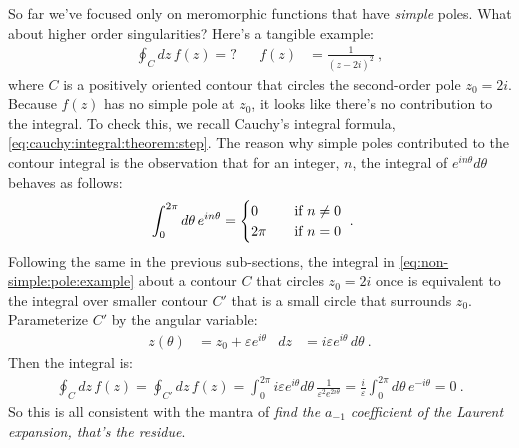 So far we've focused only on meromorphic functions that have \emph{simple} poles. What about higher order singularities? Here's a tangible example:
\begin{align}
	\oint_C dz \, f(z) = ?
	&&
	f(z) &= \frac{1}{(z-2i)^2} \ ,
	\label{eq:non-simple:pole:example}
\end{align}
where $C$ is a positively oriented contour that circles the second-order pole $z_0 = 2i$. Because $f(z)$ has no simple pole at $z_0$, it looks like there's no contribution to the integral. To check this, we recall Cauchy's integral formula, \eqref{eq:cauchy:integral:theorem:step}. The reason why simple poles contributed to the contour integral is the observation that for an integer,  $n$, the integral of $e^{in\theta}d\theta$ behaves as follows: 
\begin{align}
	\int_0^{2\pi}d\theta\, e^{in\theta} 
	&=
	\begin{cases}
	0 & \text{\quad if } n\neq 0
	\\
	2\pi  & \text{\quad if } n= 0
	\end{cases} \ .
\end{align}
Following the same in the previous sub-sections, the integral in \eqref{eq:non-simple:pole:example} about a contour $C$ that circles $z_0=2i$ once is equivalent to the integral over smaller contour $C'$ that is a small circle that surrounds $z_0$. Parameterize $C'$ by the angular variable:
\begin{align}
	z(\theta) &= z_0 + \varepsilon e^{i\theta} & dz &= i\varepsilon e^{i\theta} \, d\theta \ .
\end{align}
Then the integral is:
\begin{align}
	\oint_C dz\, f(z) 
	= 
	\oint_{C'} dz\, f(z) 
	= 
	\int_0^{2\pi} i\varepsilon e^{i\theta} d\theta\, 
	\frac{1}{\varepsilon^2 e^{2i\theta}} 
	=
	\frac{i}{\varepsilon}
	\int_0^{2\pi} d\theta\, 
	e^{-i\theta}
	= 0 \ .
	\label{eq:non-simple:pole:eg:zero}
\end{align}
So this is all consistent with the mantra of \emph{find the $a_{-1}$ coefficient of the Laurent expansion, that's the residue}. 

